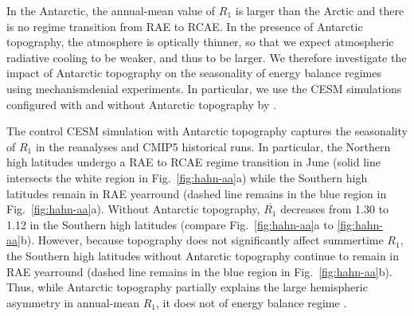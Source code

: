 \documentclass{ametsocV5}
\begin{document}

  In the Antarctic, the annual-mean value of $R_1$ is larger than the Arctic and there is no regime transition from RAE to RCAE. In the presence of Antarctic topography, the atmosphere is optically thinner, so that we expect atmospheric radiative cooling to be weaker, and thus  to be larger. We therefore investigate the impact of Antarctic topography on the seasonality of energy balance regimes using mechanism\replaced{-}{ }denial experiments. In particular, we use the CESM simulations configured with and without Antarctic topography by \cite{hahn2020}.

  The control CESM simulation with Antarctic topography captures the seasonality of $R_1$ in the reanalyses and CMIP5 historical runs. In particular, the Northern high latitudes undergo a RAE to RCAE regime transition in June (solid line intersects the white region in Fig.~\ref{fig:hahn-aa}a) while the Southern high latitudes remain in RAE yearround (dashed line remains in the blue region in Fig.~\ref{fig:hahn-aa}a). Without Antarctic topography, $\overline{R_1}$ decreases from 1.30 to 1.12 in the Southern high latitudes (compare Fig.~\ref{fig:hahn-aa}a to \ref{fig:hahn-aa}b). However, because topography does not significantly affect summertime $R_1$, the Southern high latitudes without Antarctic topography continue to remain in RAE yearround (dashed line remains in the blue region in Fig.~\ref{fig:hahn-aa}b). Thus, while Antarctic topography partially explains the large hemispheric asymmetry in annual-mean $R_1$, it does not  of energy balance regime .
  
\end{document}
